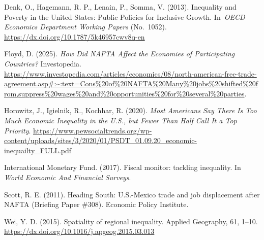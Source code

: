 \documentclass[
]{article}
\begin{document}
Denk, O., Hagemann, R. P., Lenain, P., Somma, V. (2013). Inequality and
Poverty in the United States: Public Policies for Inclusive Growth.
In~\emph{OECD Economics Department Working Papers} (No.~1052).
\url{https://dx.doi.org/10.1787/5k46957cwv8q-en}

Floyd, D. (2025). \emph{How Did NAFTA Affect the Economies of
Participating Countries?} Investopedia.
\url{https://www.investopedia.com/articles/economics/08/north-american-free-trade-agreement.asp\#:~:text=Cons\%20of\%20NAFTA\%20Many\%20jobs\%20shifted\%20from,suppress\%20wages\%20and\%20opportunities\%20for\%20several\%20parties}.

Horowitz, J., Igielnik, R., Kochhar, R. (2020). \emph{Most Americans Say
There Is Too Much Economic Inequality in the U.S., but Fewer Than Half
Call It a Top Priority}.
\url{https://www.pewsocialtrends.org/wp-content/uploads/sites/3/2020/01/PSDT_01.09.20_economic-inequailty_FULL.pdf}

International Monetary Fund. (2017). Fiscal monitor: tackling
inequality. In \emph{World Economic And Financial Surveys}.

Scott, R. E. (2011). Heading South: U.S.-Mexico trade and job
displacement after NAFTA (Briefing Paper \#308). Economic Policy
Institute.

Wei, Y. D. (2015). Spatiality of regional inequality. Applied Geography,
61, 1--10. \url{https://dx.doi.org/10.1016/j.apgeog.2015.03.013}
\end{document}
